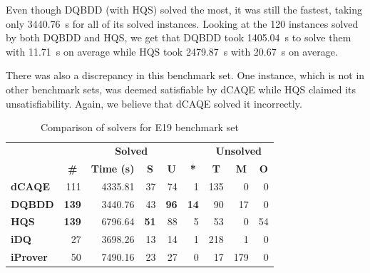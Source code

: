 \documentclass[
  digital, %
  color,
  twoside, %
  table,   %
  nolof,     %
  nolot,     %
]{fithesis3}
\theoremstyle{definition}
\theoremstyle{remark}
\begin{document}
Even though DQBDD (with HQS) solved the most, it was still the fastest, taking only \SI{3440.76}{s} for all of its solved instances. Looking at the 120 instances solved by both DQBDD and HQS, we get that DQBDD took \SI{1405.04}{s} to solve them with \SI{11.71}{s} on average while HQS took \SI{2479.87}{s} with \SI{20.67}{s} on average.

There was also a discrepancy in this benchmark set. One instance, which is not in other benchmark sets, was deemed satisfiable by dCAQE while HQS claimed its unsatisfiability. Again, we believe that dCAQE solved it incorrectly.

\begin{table}[ht]
\centering
\caption{Comparison of solvers for E19 benchmark set}%
\label{tab:E19}
\begin{tabular}{|l|r|r|r|r|r|r|r|r|}
\hline
\multicolumn{1}{|c|}{}                                  & \multicolumn{5}{c|}{\textbf{Solved}}                                                                                                                                        & \multicolumn{3}{c|}{\textbf{Unsolved}}                                                                 \\  \hhline{~*{8}{-}}
\multicolumn{1}{|c|}{\multirow{-2}{*}{\textbf{Solver}}} & \multicolumn{1}{c|}{\textbf{\#}} & \multicolumn{1}{c|}{\textbf{Time (s)}} & \multicolumn{1}{c|}{\textbf{S}} & \multicolumn{1}{c|}{\textbf{U}} & \multicolumn{1}{c|}{\textbf{*}} & \multicolumn{1}{c|}{\textbf{T}} & \multicolumn{1}{c|}{\textbf{M}} & \multicolumn{1}{c|}{\textbf{O}} \\ \hline
\textbf{dCAQE} & \num{111} & \num{4335.81} & \phantom{0}\num{37} & \phantom{0}\num{74} & \phantom{00}\num{1} & \num{135} & \num{0} & \phantom{00}\num{0} \\ \hline
\textbf{DQBDD} & \textbf{139} & \num{3440.76} & \num{43} & \textbf{96} & \textbf{14} & \num{90} & \num{17} & \num{0} \\ \hline
\textbf{HQS} & \textbf{139} & \num{6796.64} & \textbf{51} & \num{88} & \num{5} & \num{53} & \num{0} & \num{54} \\ \hline
\textbf{iDQ} & \num{27} & \num{3698.26} & \num{13} & \num{14} & \num{1} & \num{218} & \num{1} & \num{0} \\ \hline
\textbf{iProver} & \num{50} & \num{7490.16} & \num{23} & \num{27} & \num{0} & \num{17} & \num{179} & \num{0} \\ \hline
\end{tabular}
\end{table}
\end{document}
